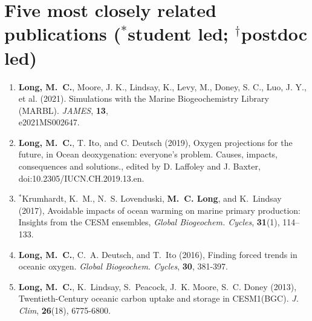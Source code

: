 \documentclass[12pt]{article}
\newcounter{H}
\begin{document}
\section{Five most closely related publications
{\footnotesize ($^*$student led; $^\dagger$postdoc led)}}
\begin{enumerate}[leftmargin=1.5em,font=\normalfont]
\setlength{\itemsep}{-0.3em}

\item
\textbf{{Long}, M.~C.}, Moore, J. K., Lindsay, K., Levy, M., Doney, S. C., Luo, J. Y., et al. (2021). Simulations with the Marine Biogeochemistry Library (MARBL). \textit{JAMES}, \textbf{13}, \\e2021MS002647.

\item
\textbf{{Long}, M.~C.}, T. Ito, and C. Deutsch (2019), Oxygen projections for the future, in Ocean deoxygenation:
everyone’s problem. Causes, impacts, consequences and solutions., edited by D. Laffoley and J. Baxter, doi:10.2305/IUCN.CH.2019.13.en.

\item
$^*${Krumhardt}, K.~M., N.~S. Lovenduski, \textbf{M.~C. Long}, and K.~Lindsay (2017),
  Avoidable impacts of ocean warming on marine primary production: Insights
  from the CESM ensembles, \textit{Global Biogeochem. Cycles},
  \textbf{31}(1), 114--133.

\item
\textbf{{Long}, M.~C.}, C.~A. {Deutsch}, and T.~Ito (2016), Finding forced trends in oceanic oxygen. \textit{Global Biogeochem. Cycles}, \textbf{30}, 381-397.

\item
\textbf{Long, M.~C.}, K.~Lindsay, S.~Peacock, J.~K. Moore, S.~C. Doney (2013), {Twentieth-Century oceanic carbon uptake and storage in CESM1(BGC)}. \textit{J. Clim}, \textbf{26}(18), 6775-6800.

\end{enumerate}
\end{document}
